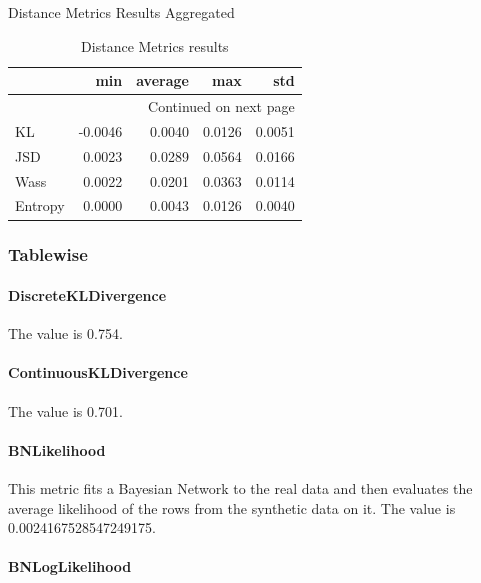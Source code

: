 \documentclass{article}
\begin{document}
\caption{Distance Metrics Results Aggregated}\label{tab:distance}   
\begin{longtable}{lrrrr}
\caption{Distance Metrics results}\label{tab:distance}\\
\toprule
{} &     min &  average &    max &    std \\
\midrule
\endhead
\midrule
\multicolumn{5}{r}{{Continued on next page}} \\
\midrule
\endfoot

\bottomrule
\endlastfoot
KL      & -0.0046 &   0.0040 & 0.0126 & 0.0051 \\
JSD     &  0.0023 &   0.0289 & 0.0564 & 0.0166 \\
Wass    &  0.0022 &   0.0201 & 0.0363 & 0.0114 \\
Entropy &  0.0000 &   0.0043 & 0.0126 & 0.0040 \\
\end{longtable}

    

\subsubsection{Tablewise}

\paragraph{DiscreteKLDivergence}

The value is 0.754.\\

\paragraph{ContinuousKLDivergence}
The value is 0.701.\\


\paragraph{BNLikelihood}

This metric fits a Bayesian Network to the real data and then evaluates the average likelihood of the rows from the synthetic data on it. 
The value is 0.0024167528547249175.\\

\paragraph{BNLogLikelihood}
\end{document}
